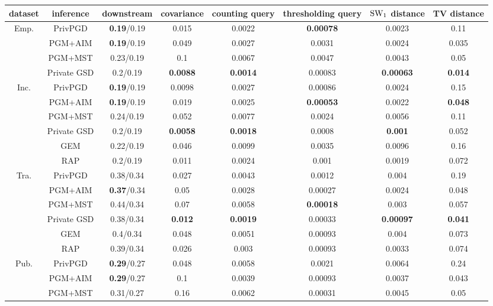 \begin{table}[ht]
\footnotesize
\centering
\begin{tabular}{cccccccc}
\toprule
dataset & inference & downstream & covariance & counting query & thresholding query & $\text{SW}_1$ distance & TV distance \\
\midrule \multirow{4}{*}{Emp. } & PrivPGD&\textbf{0.19}/0.19 & 0.015 & 0.0022 & \textbf{0.00078} & 0.0023 & 0.11 \\
 & PGM+AIM&\textbf{0.19}/0.19 & 0.049 & 0.0027 & 0.0031 & 0.0024 & 0.035 \\
 & PGM+MST&0.23/0.19 & 0.1 & 0.0067 & 0.0047 & 0.0043 & 0.05 \\
 & Private GSD&0.2/0.19 & \textbf{0.0088} & \textbf{0.0014} & 0.00083 & \textbf{0.00063} & \textbf{0.014} \\
\midrule \multirow{6}{*}{Inc. } & PrivPGD&\textbf{0.19}/0.19 & 0.0098 & 0.0027 & 0.00086 & 0.0024 & 0.15 \\
 & PGM+AIM&\textbf{0.19}/0.19 & 0.019 & 0.0025 & \textbf{0.00053} & 0.0022 & \textbf{0.048} \\
 & PGM+MST&0.24/0.19 & 0.052 & 0.0077 & 0.0024 & 0.0056 & 0.11 \\
 & Private GSD&0.2/0.19 & \textbf{0.0058} & \textbf{0.0018} & 0.0008 & \textbf{0.001} & 0.052 \\
 & GEM&0.22/0.19 & 0.046 & 0.0099 & 0.0035 & 0.0096 & 0.16 \\
 & RAP&0.2/0.19 & 0.011 & 0.0024 & 0.001 & 0.0019 & 0.072 \\
\midrule \multirow{6}{*}{Tra. } & PrivPGD&0.38/0.34 & 0.027 & 0.0043 & 0.0012 & 0.004 & 0.19 \\
 & PGM+AIM&\textbf{0.37}/0.34 & 0.05 & 0.0028 & 0.00027 & 0.0024 & 0.048 \\
 & PGM+MST&0.44/0.34 & 0.07 & 0.0058 & \textbf{0.00018} & 0.003 & 0.057 \\
 & Private GSD&0.38/0.34 & \textbf{0.012} & \textbf{0.0019} & 0.00033 & \textbf{0.00097} & \textbf{0.041} \\
 & GEM&0.4/0.34 & 0.048 & 0.0051 & 0.00093 & 0.004 & 0.073 \\
 & RAP&0.39/0.34 & 0.026 & 0.003 & 0.00093 & 0.0033 & 0.074 \\
\midrule \multirow{6}{*}{Pub. } & PrivPGD&\textbf{0.29}/0.27 & 0.048 & 0.0058 & 0.0021 & 0.0064 & 0.24 \\
 & PGM+AIM&\textbf{0.29}/0.27 & 0.1 & 0.0039 & 0.00093 & 0.0037 & 0.043 \\
 & PGM+MST&0.31/0.27 & 0.16 & 0.0062 & 0.00031 & 0.0045 & 0.05 \\

\end{tabular}
\end{table}

